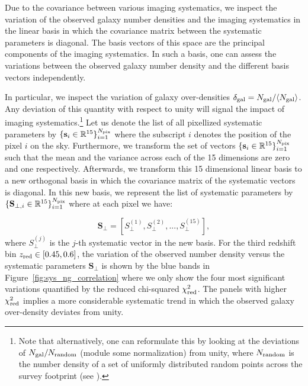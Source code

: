 \documentclass[fleqn,usenatbib,useAMS]{mnras}
\begin{document}
Due to the covariance between various imaging systematics, we inspect the variation of the observed galaxy number densities and the imaging systematics in the linear basis in which the covariance matrix between the systematic parameters is diagonal. The basis vectors of this space are the principal components of the imaging systematics. In such a basis, one can assess the variations between the observed galaxy number density and the different basis vectors independently. 

In particular, we inspect the variation of galaxy over-densities $\delta_{\rm gal} = N_{\rm gal}/\langle N_{\rm gal} \rangle$. Any deviation of this quantity with respect to unity will signal the impact of imaging systematics.\footnote{Note that alternatively, one can reformulate this by looking at the deviations of $N_{\rm gal}/N_{\rm random}$ (module some normalization) from unity, where $N_{\rm random}$ is the number density of a set of uniformly distributed random points across the survey footprint (see \citep[e.g. ][]{bautista2018sdss, icaza2020clustering}).} 
Let us denote the list of all pixellized systematic parameters by $\{\mathbf{s}_{i} \in \mathbb{R}^{15}\}_{i=1}^{N_{\rm pix}}$ where the subscript $i$ denotes the position of the pixel $i$ on the sky. Furthermore, we transform the set of vectors 
$\{\mathbf{s}_{i} \in \mathbb{R}^{15}\}_{i=1}^{N_{\rm pix}}$ such that the mean and the variance across each of the 15 dimensions are zero and one respectively. Afterwards, we transform this 15 dimensional linear basis to a new orthogonal basis in which the covariance matrix of the systematic vectors is diagonal. In this new basis, we represent the list of systematic parameters by $\{\mathbf{S}_{\perp,i} \in \mathbb{R}^{15}\}_{i=1}^{N_{\rm pix}}$ where at each pixel we have:

\begin{equation}
    \mathbf{S}_{\perp} = [S_{\perp}^{(1)}, S_{\perp}^{(2)}, ..., S_{\perp}^{(15)}],
\end{equation}
where $S_{\perp}^{(j)}$ is the $j$-th systematic vector in the new basis. For the third redshift bin $z_{\rm red} \in [0.45, 0.6]$, the variation of the observed number density versus the systematic parameters $\mathbf{S}_{\perp}$ is shown by the blue bands in Figure~\ref{fig:sys_ng_correlation} where we only show the four most significant variations quantified by the reduced chi-squared $\chi^2_{\rm red}$. The panels with higher $\chi^{2}_{\rm red}$ implies a more considerable systematic trend in which the observed galaxy over-density deviates from unity.  
\end{document}
